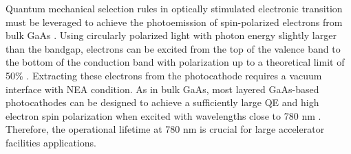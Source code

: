 
Quantum mechanical selection rules in optically stimulated electronic transition must be leveraged to achieve the photoemission of spin-polarized electrons from bulk GaAs \cite{pierce1976,liu2017_ComprehensiveEvaluationFactors}. Using circularly polarized light with photon energy slightly larger than the bandgap, electrons can be excited from the top of the valence band to the bottom of the conduction band with polarization up to a theoretical limit of 50\% \cite{pierce1976}. Extracting these electrons from the photocathode requires a vacuum interface with NEA condition.
As in bulk GaAs, most layered GaAs-based photocathodes can be designed to achieve a sufficiently large QE and high electron spin polarization when excited with wavelengths close to 780 nm \cite{liu2016_RecordlevelQuantumEfficiency}.
Therefore, the operational lifetime at 780 nm is crucial for large accelerator facilities applications.

